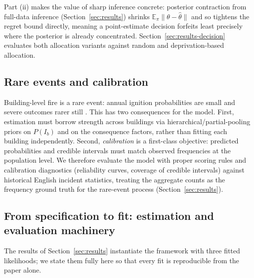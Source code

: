 Part (ii) makes the value of sharp inference concrete: posterior contraction from
full-data inference (Section~\ref{sec:results}) shrinks
$\mathbb{E}_\pi\|\theta - \hat\theta\|$ and so tightens the regret bound directly,
meaning a point-estimate decision forfeits least precisely where the posterior is
already concentrated. Section~\ref{sec:results-decision} evaluates both allocation
variants against random and deprivation-based allocation.

\subsection{Rare events and calibration}
\label{sec:model-rare}

Building-level fire is a rare event: annual ignition probabilities are small and
severe outcomes rarer still \citep{mhclg2026firestats}. This has two
consequences for the model. First, estimation must borrow strength across
buildings via hierarchical/partial-pooling priors on $P(I_b)$ and on the
consequence factors, rather than fitting each building independently. Second,
\emph{calibration} is a first-class objective: predicted probabilities and
credible intervals must match observed frequencies at the population level.
We therefore evaluate the model with proper scoring rules and calibration
diagnostics (reliability curves, coverage of credible intervals) against
historical English incident statistics, treating the aggregate counts as the
frequency ground truth for the rare-event process (Section~\ref{sec:results}).

\subsection{From specification to fit: estimation and evaluation machinery}
\label{sec:model-estimation}

The results of Section~\ref{sec:results} instantiate the framework with three
fitted likelihoods; we state them fully here so that every fit is reproducible
from the paper alone.

